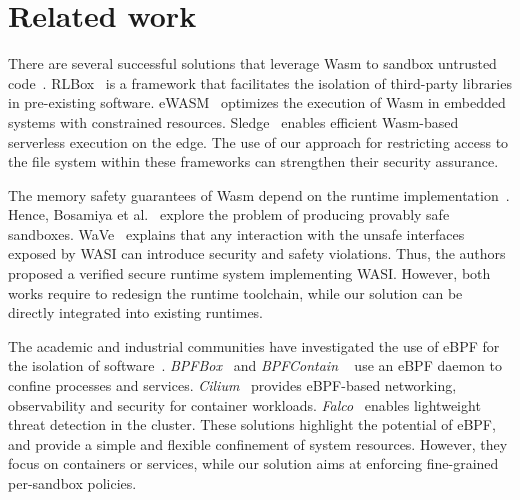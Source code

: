 \section{Related work}
\label{wasm:rel_works}

There are several successful solutions that leverage Wasm to sandbox
untrusted code~\cite{RLBox, ewasm, sledge}. RLBox~\cite{RLBox} is a
framework that facilitates the isolation of third-party libraries in
pre-existing software. eWASM~\cite{ewasm} optimizes the execution of
Wasm in embedded systems with constrained resources. Sledge~\cite{sledge}
enables efficient Wasm-based serverless execution on the
edge. The use of our approach for restricting access to the file
system within these frameworks can strengthen their security
assurance.

The memory safety guarantees of Wasm depend on the runtime
implementation~\cite{lehmann2020everything}. Hence, Bosamiya et
al.~\cite{bosamiya2022provably} explore the problem of producing
provably safe sandboxes. WaVe~\cite{johnson2022wave} explains that any
interaction with the unsafe interfaces exposed by WASI can
introduce security and safety violations. Thus, the authors proposed
a verified secure runtime system
implementing WASI. However, both works require to redesign the runtime
toolchain, while our solution can be directly integrated into existing
runtimes.

The academic and industrial communities have investigated the use of eBPF
for the isolation of software~\cite{findlay2020bpfbox, findlay2021bpfcontain,
cilium-repo, falco}.
{\em BPFBox}~\cite{findlay2020bpfbox} and {\em BPFContain}
~\cite{findlay2021bpfcontain} use an eBPF daemon to confine processes and
services.
{\em Cilium}~\cite{cilium-repo} provides eBPF-based networking, observability
and security for container workloads.
{\em Falco}~\cite{falco} enables lightweight threat detection in the
cluster. These solutions highlight the potential of eBPF, and provide
a simple and flexible confinement of system resources. However, they
focus on containers or services, while our solution aims at enforcing
fine-grained per-sandbox policies.


